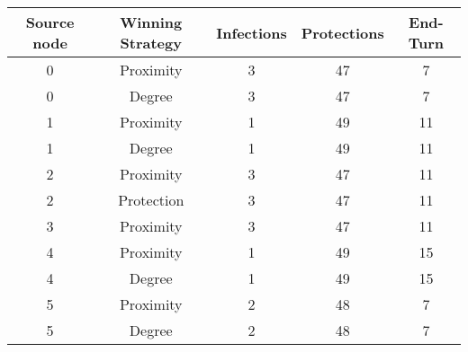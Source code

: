 \documentclass[results.tex]{subfiles}
\begin{document}
    \begin{center}
        \begin{tabular}{| c || c | c | c | c |}
            \hline
            {\bfseries Source node} & {\bfseries Winning Strategy} & {\bfseries Infections} & {\bfseries Protections}
            & {\bfseries End-Turn}
            \\  %
            \hline\hline
            0                       & Proximity                    & 3                      & 47                      & 7                    \\
            \hline
            0                       & Degree                       & 3                      & 47                      & 7                    \\
            \hline
            1                       & Proximity                    & 1                      & 49                      & 11                   \\
            \hline
            1                       & Degree                       & 1                      & 49                      & 11                   \\
            \hline
            2                       & Proximity                    & 3                      & 47                      & 11                   \\
            \hline
            2                       & Protection                   & 3                      & 47                      & 11                   \\
            \hline
            3                       & Proximity                    & 3                      & 47                      & 11                   \\
            \hline
            4                       & Proximity                    & 1                      & 49                      & 15                   \\
            \hline
            4                       & Degree                       & 1                      & 49                      & 15                   \\
            \hline
            5                       & Proximity                    & 2                      & 48                      & 7                    \\
            \hline
            5                       & Degree                       & 2                      & 48                      & 7                    \\

\end{tabular}
\end{center}
\end{document}
